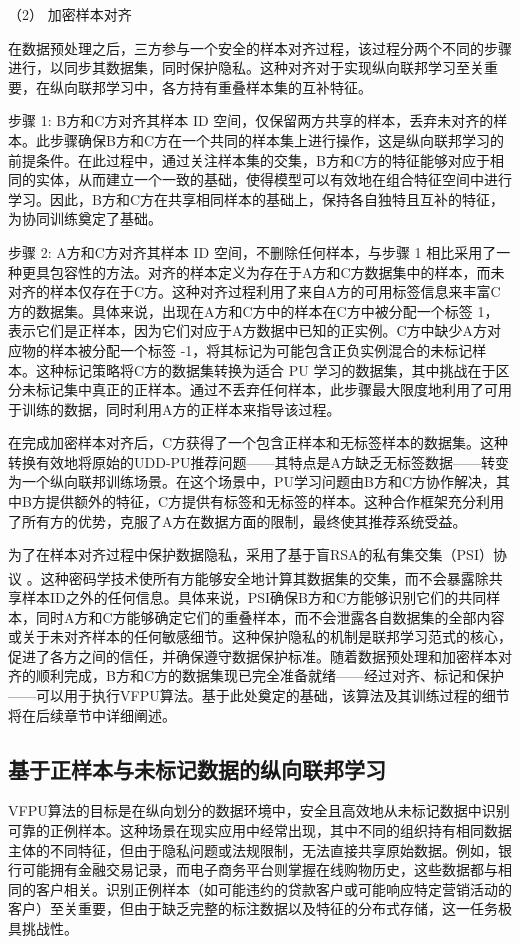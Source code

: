 （2） 加密样本对齐

在数据预处理之后，三方参与一个安全的样本对齐过程，该过程分两个不同的步骤进行，以同步其数据集，同时保护隐私。这种对齐对于实现纵向联邦学习至关重要，在纵向联邦学习中，各方持有重叠样本集的互补特征。 

步骤 1: B方和C方对齐其样本 ID 空间，仅保留两方共享的样本，丢弃未对齐的样本。此步骤确保B方和C方在一个共同的样本集上进行操作，这是纵向联邦学习的前提条件。在此过程中，通过关注样本集的交集，B方和C方的特征能够对应于相同的实体，从而建立一个一致的基础，使得模型可以有效地在组合特征空间中进行学习。因此，B方和C方在共享相同样本的基础上，保持各自独特且互补的特征，为协同训练奠定了基础。

步骤 2: A方和C方对齐其样本 ID 空间，不删除任何样本，与步骤 1 相比采用了一种更具包容性的方法。对齐的样本定义为存在于A方和C方数据集中的样本，而未对齐的样本仅存在于C方。这种对齐过程利用了来自A方的可用标签信息来丰富C方的数据集。具体来说，出现在A方和C方中的样本在C方中被分配一个标签 1，表示它们是正样本，因为它们对应于A方数据中已知的正实例。C方中缺少A方对应物的样本被分配一个标签 -1，将其标记为可能包含正负实例混合的未标记样本。这种标记策略将C方的数据集转换为适合 PU 学习的数据集，其中挑战在于区分未标记集中真正的正样本。通过不丢弃任何样本，此步骤最大限度地利用了可用于训练的数据，同时利用A方的正样本来指导该过程。

在完成加密样本对齐后，C方获得了一个包含正样本和无标签样本的数据集。这种转换有效地将原始的UDD-PU推荐问题——其特点是A方缺乏无标签数据——转变为一个纵向联邦训练场景。在这个场景中，PU学习问题由B方和C方协作解决，其中B方提供额外的特征，C方提供有标签和无标签的样本。这种合作框架充分利用了所有方的优势，克服了A方在数据方面的限制，最终使其推荐系统受益。

为了在样本对齐过程中保护数据隐私，采用了基于盲RSA的私有集交集（PSI）协议 \textsuperscript{\cite{de2010practical}}。这种密码学技术使所有方能够安全地计算其数据集的交集，而不会暴露除共享样本ID之外的任何信息。具体来说，PSI确保B方和C方能够识别它们的共同样本，同时A方和C方能够确定它们的重叠样本，而不会泄露各自数据集的全部内容或关于未对齐样本的任何敏感细节。这种保护隐私的机制是联邦学习范式的核心，促进了各方之间的信任，并确保遵守数据保护标准。随着数据预处理和加密样本对齐的顺利完成，B方和C方的数据集现已完全准备就绪——经过对齐、标记和保护——可以用于执行VFPU算法。基于此处奠定的基础，该算法及其训练过程的细节将在后续章节中详细阐述。


\subsection{基于正样本与未标记数据的纵向联邦学习}
VFPU算法的目标是在纵向划分的数据环境中，安全且高效地从未标记数据中识别可靠的正例样本。这种场景在现实应用中经常出现，其中不同的组织持有相同数据主体的不同特征，但由于隐私问题或法规限制，无法直接共享原始数据。例如，银行可能拥有金融交易记录，而电子商务平台则掌握在线购物历史，这些数据都与相同的客户相关。识别正例样本（如可能违约的贷款客户或可能响应特定营销活动的客户）至关重要，但由于缺乏完整的标注数据以及特征的分布式存储，这一任务极具挑战性。

